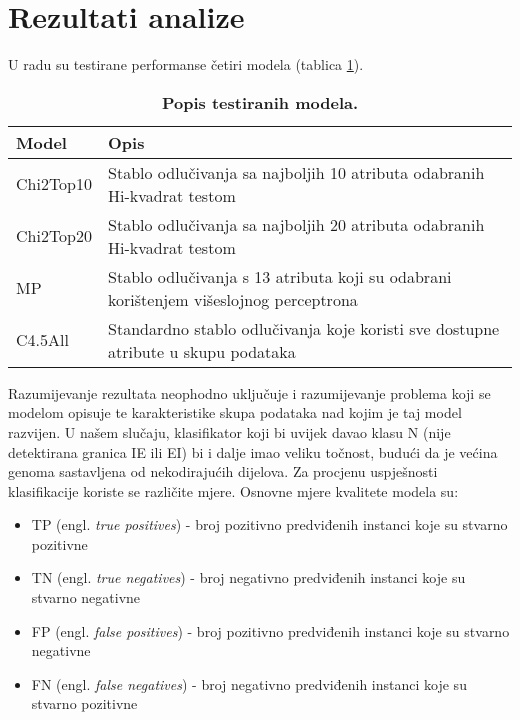 \section{Rezultati analize}
\label{ch:ch5}

U radu su testirane performanse četiri modela (tablica \ref{tab:models}).

\begin{table}[!ht]
    \centering
    \caption[Popis testiranih modela]{\textbf{Popis testiranih modela.}}
    \label{tab:models}
    \begin{tabular}{|| p{2cm} | p{13cm} ||}
            \hline
            Model & Opis \\ [0.5ex]
            \hline
            \hline
            Chi2Top10 & Stablo odlučivanja sa najboljih 10 atributa odabranih Hi-kvadrat testom \\
            \hline
            Chi2Top20 & Stablo odlučivanja sa najboljih 20 atributa odabranih Hi-kvadrat testom \\
            \hline
            MP & Stablo odlučivanja s 13 atributa koji su odabrani korištenjem višeslojnog perceptrona \\
            \hline
            C4.5All & Standardno stablo odlučivanja koje koristi sve dostupne atribute u skupu podataka \\ [1ex]
            \hline
    \end{tabular}
\end{table}
Razumijevanje rezultata neophodno uključuje i razumijevanje problema koji se modelom opisuje te karakteristike skupa podataka nad kojim je taj model razvijen. U našem slučaju, klasifikator koji bi uvijek davao klasu N (nije detektirana granica IE ili EI) bi i dalje imao veliku točnost, budući da je većina genoma sastavljena od nekodirajućih dijelova. Za procjenu uspješnosti klasifikacije koriste se različite mjere. 
Osnovne mjere kvalitete modela su:
\begin{itemize}
   \item TP (engl. \textit{true positives}) - broj pozitivno predviđenih instanci koje su stvarno pozitivne
   \item TN (engl. \textit{true negatives}) - broj negativno predviđenih instanci koje su stvarno negativne
   \item FP (engl. \textit{false positives}) - broj pozitivno predviđenih instanci koje su stvarno negativne
   \item FN (engl. \textit{false negatives}) - broj negativno predviđenih instanci koje su stvarno pozitivne
\end{itemize}
